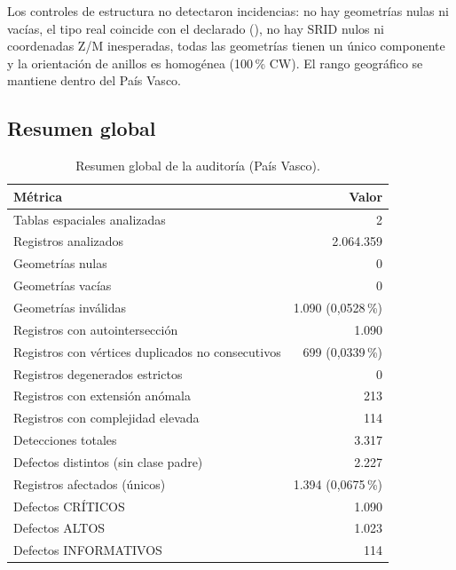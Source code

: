 Los controles de estructura no detectaron incidencias: no hay geometrías nulas ni vacías, el tipo real coincide con el declarado (), no hay SRID nulos ni coordenadas Z/M inesperadas, todas las geometrías tienen un único componente y la orientación de anillos es homogénea (100\,\% CW). El rango geográfico se mantiene dentro del País Vasco.

\subsection{Resumen global}

\begin{table}[H]
	\centering
	\caption{Resumen global de la auditoría (País Vasco).}
	\label{tab:pv-global}
	\begin{tabularx}{\textwidth}{@{}X r@{}}
		\toprule
		\textbf{Métrica}                                  & \textbf{Valor}     \\
		\midrule
		Tablas espaciales analizadas                      & 2                  \\
		Registros analizados                              & 2.064.359          \\
		Geometrías nulas                                  & 0                  \\
		Geometrías vacías                                 & 0                  \\
		Geometrías inválidas                              & 1.090 (0,0528\,\%) \\
		Registros con autointersección                    & 1.090              \\
		Registros con vértices duplicados no consecutivos & 699 (0,0339\,\%)   \\
		Registros degenerados estrictos                   & 0                  \\
		Registros con extensión anómala                   & 213                \\
		Registros con complejidad elevada                 & 114                \\
		\midrule
		Detecciones totales                               & 3.317              \\
		Defectos distintos (sin clase padre)              & 2.227              \\
		Registros afectados (únicos)                      & 1.394 (0,0675\,\%) \\
		Defectos CRÍTICOS                                 & 1.090              \\
		Defectos ALTOS                                    & 1.023              \\
		Defectos INFORMATIVOS                             & 114                \\
		\bottomrule
	\end{tabularx}
\end{table}

